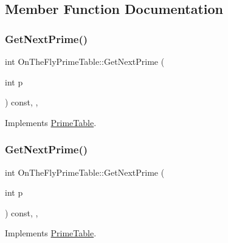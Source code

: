 \subsection{Member Function Documentation}
\mbox{\label{class_on_the_fly_prime_table_a0f6f934f318407a812098e67584b60bf}} 
\subsubsection{\texorpdfstring{GetNextPrime()}{GetNextPrime()}\hspace{0.1cm}{\footnotesize\ttfamily [1/3]}}
{\footnotesize\ttfamily int On\+The\+Fly\+Prime\+Table\+::\+Get\+Next\+Prime (\begin{DoxyParamCaption}\item[{int}]{p }\end{DoxyParamCaption}) const\hspace{0.3cm}{\ttfamily [inline]}, {\ttfamily [override]}, {\ttfamily [virtual]}}



Implements \mbox{\hyperlink{class_prime_table_ae537c939f56617d8937d57bbbae3ab30}{Prime\+Table}}.

\mbox{\label{class_on_the_fly_prime_table_a0f6f934f318407a812098e67584b60bf}} 
\subsubsection{\texorpdfstring{GetNextPrime()}{GetNextPrime()}\hspace{0.1cm}{\footnotesize\ttfamily [2/3]}}
{\footnotesize\ttfamily int On\+The\+Fly\+Prime\+Table\+::\+Get\+Next\+Prime (\begin{DoxyParamCaption}\item[{int}]{p }\end{DoxyParamCaption}) const\hspace{0.3cm}{\ttfamily [inline]}, {\ttfamily [override]}, {\ttfamily [virtual]}}



Implements \mbox{\hyperlink{class_prime_table_ae537c939f56617d8937d57bbbae3ab30}{Prime\+Table}}.

